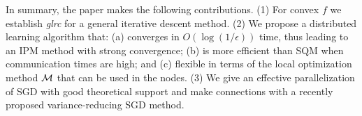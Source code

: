 


In summary, the paper makes the following contributions. (1) For convex $f$ we establish {\it glrc} for a general iterative descent method. (2) We propose a distributed learning algorithm that: (a) converges in $O(\log (1/\epsilon))$ time, thus leading to an IPM method with strong convergence; (b) is more efficient than SQM when communication times are high; and (c) flexible in terms of the local optimization method ${\cal M}$ that can be used in the nodes. (3) We give an effective parallelization of SGD with good theoretical support and make connections with a recently proposed variance-reducing SGD method. 

